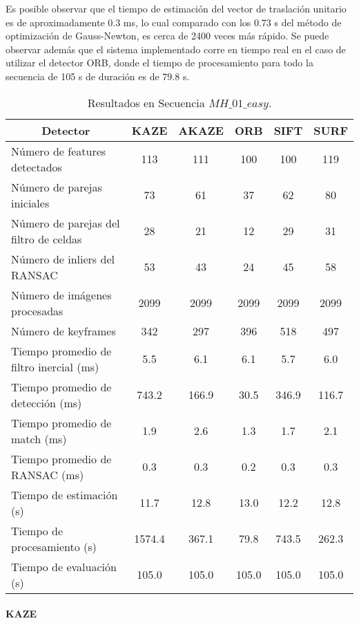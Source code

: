 Es posible observar que el tiempo de estimación del vector de traslación unitario es de aproximadamente 0.3 ms, lo cual comparado con los 0.73 s del método de optimización de Gauss-Newton, es cerca de 2400 veces más rápido. Se puede observar además que el sistema implementado corre en tiempo real en el caso de utilizar el detector ORB, donde el tiempo de procesamiento para todo la secuencia de 105 s de duración es de 79.8 s.


\begin{table}[H]
	\caption{Resultados en Secuencia $MH\_ 01\_ easy$.}
	\begin{tabular}{|l|c|c|c|c|c|}
		\hline
		\multicolumn{1}{|c|}{\textbf{Detector}} & \textbf{KAZE} & \textbf{AKAZE} & \textbf{ORB} & \textbf{SIFT} & \textbf{SURF} \\ \hline
		Número de features detectados & 113 & 111 & 100 & 100 & 119 \\ \hline
		Número de parejas iniciales & 73 & 61 & 37 & 62 & 80 \\ \hline
		Número de parejas del filtro de celdas & 28 & 21 & 12 & 29 & 31 \\ \hline
		Número de inliers del RANSAC & 53 & 43 & 24 & 45 & 58 \\ \hline
		Número de imágenes procesadas & 2099 & 2099 & 2099 & 2099 & 2099 \\ \hline
		Número de keyframes & 342 & 297 & 396 & 518 & 497 \\ \hline
		Tiempo promedio de filtro inercial (ms) & 5.5 & 6.1 & 6.1 & 5.7 & 6.0 \\ \hline
		Tiempo promedio de detección  (ms) & 743.2 & 166.9 & 30.5 & 346.9 & 116.7 \\ \hline
		Tiempo promedio de match (ms) & 1.9 & 2.6 & 1.3 & 1.7 & 2.1 \\ \hline
		Tiempo promedio de RANSAC (ms) & 0.3 & 0.3 & 0.2 & 0.3 & 0.3 \\ \hline
		Tiempo de estimación (s) & 11.7 & 12.8 & 13.0 & 12.2 & 12.8 \\ \hline
		Tiempo de  procesamiento (s) & 1574.4 & 367.1 & 79.8 & 743.5 & 262.3 \\ \hline
		Tiempo de evaluación (s) & 105.0 & 105.0 & 105.0 & 105.0 & 105.0 \\ \hline
	\end{tabular}
	\label{Tabla/Resultados/MH_01_easy}
\end{table}



\paragraph {KAZE}


